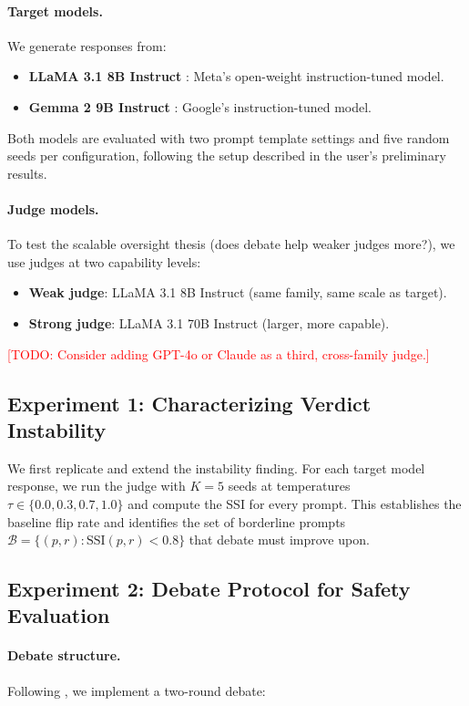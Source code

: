 \documentclass[preprint]{article}
\newcommand{\ssi}{\text{SSI}}
\newcommand{\todo}[1]{\textcolor{red}{[TODO: #1]}}
\begin{document}
\paragraph{Target models.} We generate responses from:
\begin{itemize}
    \item \textbf{LLaMA 3.1 8B Instruct} \citep{llama3}: Meta's open-weight instruction-tuned model.
    \item \textbf{Gemma 2 9B Instruct} \citep{gemma2024}: Google's instruction-tuned model.
\end{itemize}
Both models are evaluated with two prompt template settings and five random seeds per configuration, following the setup described in the user's preliminary results.

\paragraph{Judge models.} To test the scalable oversight thesis (does debate help weaker judges more?), we use judges at two capability levels:
\begin{itemize}
    \item \textbf{Weak judge}: LLaMA 3.1 8B Instruct (same family, same scale as target).
    \item \textbf{Strong judge}: LLaMA 3.1 70B Instruct (larger, more capable).
\end{itemize}
\todo{Consider adding GPT-4o or Claude as a third, cross-family judge.}

\subsection{Experiment 1: Characterizing Verdict Instability}
\label{sec:exp1}

We first replicate and extend the instability finding. For each target model response, we run the judge with $K = 5$ seeds at temperatures $\tau \in \{0.0, 0.3, 0.7, 1.0\}$ and compute the SSI for every prompt. This establishes the baseline flip rate and identifies the set of borderline prompts $\mathcal{B} = \{(p,r) : \ssi(p,r) < 0.8\}$ that debate must improve upon.

\subsection{Experiment 2: Debate Protocol for Safety Evaluation}
\label{sec:exp2}

\paragraph{Debate structure.} Following \citet{khan2024debating}, we implement a two-round debate:
\end{document}
